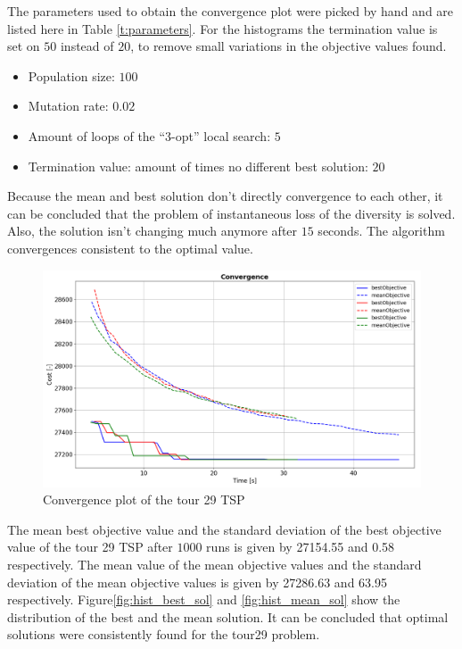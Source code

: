 \documentclass[a4paper,10pt]{article}
\begin{document}
The parameters used to obtain the convergence plot were picked by hand and are listed here in Table \ref{t:parameters}. For the histograms the termination value is set on $ 50 $ instead of $ 20 $, to remove small variations in the objective values found.
\begin{itemize}
	\item Population size: $ 100 $
	\item Mutation rate: $ 0.02 $
	\item Amount of loops of the ``3-opt'' local search: $ 5 $
	\item Termination value: amount of times no different best solution: $ 20 $ 
\end{itemize}
  
Because the mean and best solution don't directly convergence to each other, it can be concluded that the problem of instantaneous loss of the diversity is solved. Also, the solution isn't changing much anymore after $ 15 $ seconds. The algorithm convergences consistent to the optimal value. 


\begin{figure}[h!]
	\includegraphics[width=1\textwidth]{Convergence_tour29.PNG}
	\caption{Convergence plot of the tour 29 TSP}
	\label{fig:convergence_tour29}
	\centering
\end{figure}

The mean best objective value and the standard deviation of the best objective value of the tour 29 TSP after $ 1000 $ runs is given by 27154.55  and 0.58 respectively. The mean value of the mean objective values and the standard deviation of the mean objective values is given by 27286.63 and 63.95 respectively. Figure\ref{fig:hist_best_sol} and \ref{fig:hist_mean_sol} show the distribution of the best and the mean solution. It can be concluded that optimal solutions were consistently found for the tour29 problem.  
\end{document}
